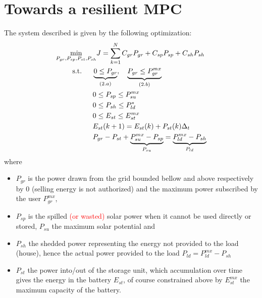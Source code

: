 \documentclass{ifacconf}
\begin{document}
\section{Towards a resilient MPC }\label{section3}
The system described  is given by the following optimization: 
\begin{align} 
& \underset{P_{gr},P_{sp},P_{st},P_{sh}}{\text{min}} J = \sum_{k=1}^{N} C_{gr}P_{gr} + C_{sp}P_{sp}+ C_{sh}P_{sh} \label{eq:cost2min}\\
& \text{\hspace{20px} s.t.\hspace{15px}}  \underbrace{0 \leq P_{gr}}_{(2.a)}, \hspace{10px} \underbrace{P_{gr}\leq P_{gr}^{mx}}_{(2.b)} \label{eq:Pgr_cons} \\
& \hspace{52px} 0 \leq P_{sp} \leq P_{su}^{mx} \label{eq:Pcu_cons}\\
& \hspace{52px} 0 \leq P_{sh} \leq P_{ld}^{*} \label{eq:Psh_cons} \\
& \hspace{52px} 0 \leq E_{st} \leq E_{st}^{mx} \label{eq:Est_cons} \\
& \hspace{52px} E_{st}(k+1) = E_{st}(k) + P_{st}(k)\Delta_t \label{eq:Est_dyn}  \\
& \hspace{52px} P_{gr}- P_{st}+ \underbrace{P_{su}^{mx}-P_{sp}}_{P_{su}} =\underbrace{P_{ld}^{mx} - P_{sh}}_{P_{ld}} \label{eq:Engy_csvt} 
\end{align}
where
\begin{itemize}
\item $P_{gr}$ is the power drawn from the grid bounded bellow and above
respectively by 0 (selling energy is not authorized) and the maximum power subscribed by the user $P_{gr}^{mx}$,
\item $P_{sp}$ is the spilled \textcolor{red}{(or wasted)} solar power when it cannot be used directly or stored, $P_{su}$ the maximum solar potential and 
\item $P_{sh}$ the shedded power representing the energy not provided to the load (house), hence the actual power provided to the load $P_{ld} = P_{ld}^{mx} - P_{sh}$
\item $P_{st}$ the power into/out of the storage unit, which accumulation over time gives the energy in the battery $E_{st}$, of course constrained above by $E_{st}^{mx}$ the maximum capacity of the battery. 
\end{itemize}
\end{document}
